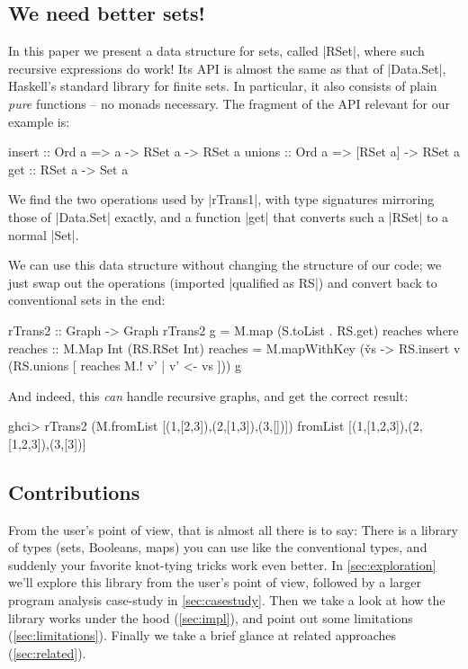 \documentclass[manuscript,review,screen,acmsmall]{acmart}
\begin{document}
\subsection{We need better sets!}

In this paper we present a data structure for sets, called |RSet|, where such recursive expressions do work! Its API is almost the same as that of |Data.Set|, Haskell's standard library for finite sets. In particular, it also consists of plain \emph{pure} functions -- no monads necessary. The fragment of the API relevant for our example is:
\begin{code}
insert  :: Ord a =>  a -> RSet a  -> RSet a
unions  :: Ord a =>  [RSet a]     -> RSet a
get     ::           RSet a       -> Set a
\end{code}
We find the two operations used by |rTrans1|, with type signatures mirroring those of |Data.Set| exactly, and a function |get| that converts such a |RSet| to a normal |Set|.

We can use this data structure without changing the structure of our code; we just swap out the operations (imported |qualified as RS|) and convert back to conventional sets in the end:
\begin{code}
rTrans2 :: Graph -> Graph
rTrans2 g = M.map (S.toList . RS.get) reaches
  where
    reaches :: M.Map Int (RS.RSet Int)
    reaches = M.mapWithKey (\v vs -> RS.insert v (RS.unions [ reaches M.! v' | v' <- vs ])) g
\end{code}

And indeed, this \emph{can} handle recursive graphs, and get the correct result:
\begin{code}
ghci> rTrans2 (M.fromList [(1,[2,3]),(2,[1,3]),(3,[])])
fromList [(1,[1,2,3]),(2,[1,2,3]),(3,[3])]
\end{code}

\subsection{Contributions}

From the user’s point of view, that is almost all there is  to say: There is a library of types (sets, Booleans, maps) you can use like the conventional types, and suddenly your favorite knot-tying tricks work even better. In \cref{sec:exploration} we'll explore this library from the user's point of view, followed by a larger program analysis case-study in \cref{sec:casestudy}. Then we take a look at how the library works under the hood (\cref{sec:impl}), and point out some limitations (\cref{sec:limitations}). Finally we take a brief glance at related approaches (\cref{sec:related}).
\end{document}
